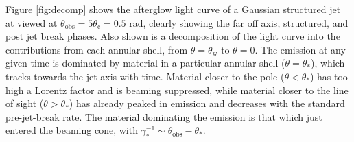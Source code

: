 \documentclass[twocolumn]{aastex62}
\newcommand{\thobs}{\ensuremath{\theta_{\mathrm{obs}}}}
\newcommand{\thW}{\ensuremath{\theta_{\mathrm{w}}}}
\newcommand{\thC}{\ensuremath{\theta_{\mathrm{c}}}}
\begin{document}
Figure \ref{fig:decomp} shows the afterglow light curve of a Gaussian structured jet at viewed at $\thobs = 5 \thC = 0.5$ rad, clearly showing the far off axis, structured, and post jet break phases.  Also shown is a decomposition of the light curve into the contributions from each annular shell, from $\theta =\thW$ to $\theta = 0$.  The emission at any given time is dominated by material in a particular annular shell ($\theta = \theta_*$), which tracks towards the jet axis with time.  Material closer to the pole ($\theta < \theta_*$) has too high a Lorentz factor and is beaming suppressed, while material closer to the line of sight ($\theta > \theta_*$) has already peaked in emission and decreases with the standard pre-jet-break rate.  The material dominating the emission is that which just entered the beaming cone, with $\gamma_*^{-1} \sim \thobs-\theta_*$.
\end{document}
